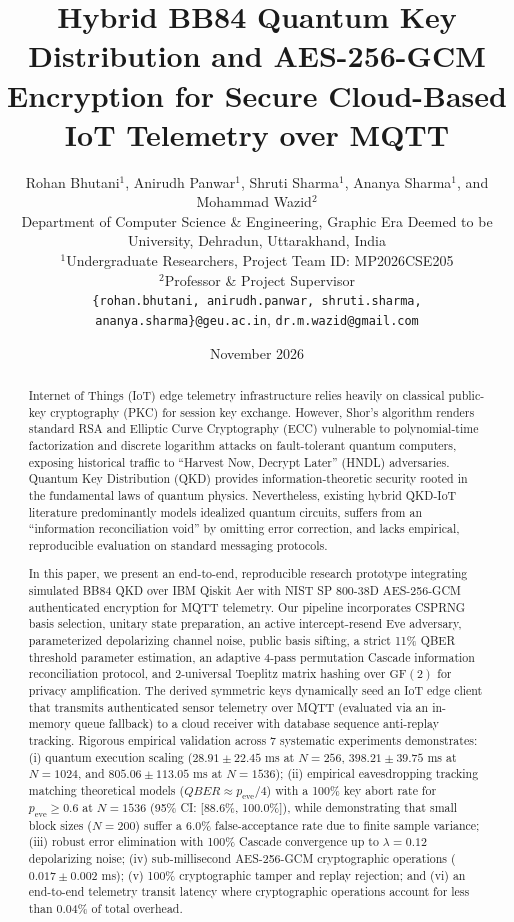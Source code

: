 \documentclass[journal,10pt,twocolumn]{article}
\title{\textbf{Hybrid BB84 Quantum Key Distribution and AES-256-GCM Encryption for Secure Cloud-Based IoT Telemetry over MQTT}}
\author{
    Rohan Bhutani$^1$, Anirudh Panwar$^1$, Shruti Sharma$^1$, Ananya Sharma$^1$, and Mohammad Wazid$^2$ \\
    \small Department of Computer Science \& Engineering, Graphic Era Deemed to be University, Dehradun, Uttarakhand, India \\
    \small $^1$Undergraduate Researchers, Project Team ID: MP2026CSE205 \\
    \small $^2$Professor \& Project Supervisor \\
    \small \texttt{\{rohan.bhutani, anirudh.panwar, shruti.sharma, ananya.sharma\}@geu.ac.in}, \texttt{dr.m.wazid@gmail.com}
}
\date{November 2026}
\begin{document}
\maketitle

\begin{abstract}
Internet of Things (IoT) edge telemetry infrastructure relies heavily on classical public-key cryptography (PKC) for session key exchange. However, Shor's algorithm renders standard RSA and Elliptic Curve Cryptography (ECC) vulnerable to polynomial-time factorization and discrete logarithm attacks on fault-tolerant quantum computers, exposing historical traffic to ``Harvest Now, Decrypt Later'' (HNDL) adversaries. Quantum Key Distribution (QKD) provides information-theoretic security rooted in the fundamental laws of quantum physics. Nevertheless, existing hybrid QKD-IoT literature predominantly models idealized quantum circuits, suffers from an ``information reconciliation void'' by omitting error correction, and lacks empirical, reproducible evaluation on standard messaging protocols. 

In this paper, we present an end-to-end, reproducible research prototype integrating simulated BB84 QKD over IBM Qiskit Aer with NIST SP 800-38D AES-256-GCM authenticated encryption for MQTT telemetry. Our pipeline incorporates CSPRNG basis selection, unitary state preparation, an active intercept-resend Eve adversary, parameterized depolarizing channel noise, public basis sifting, a strict 11\% QBER threshold parameter estimation, an adaptive 4-pass permutation Cascade information reconciliation protocol, and 2-universal Toeplitz matrix hashing over $\text{GF}(2)$ for privacy amplification. The derived symmetric keys dynamically seed an IoT edge client that transmits authenticated sensor telemetry over MQTT (evaluated via an in-memory queue fallback) to a cloud receiver with database sequence anti-replay tracking. Rigorous empirical validation across 7 systematic experiments demonstrates: (i) quantum execution scaling ($28.91 \pm 22.45$ ms at $N=256$, $398.21 \pm 39.75$ ms at $N=1024$, and $805.06 \pm 113.05$ ms at $N=1536$); (ii) empirical eavesdropping tracking matching theoretical models ($QBER \approx p_{\text{eve}}/4$) with a 100\% key abort rate for $p_{\text{eve}} \ge 0.6$ at $N=1536$ (95\% CI: [88.6\%, 100.0\%]), while demonstrating that small block sizes ($N=200$) suffer a 6.0\% false-acceptance rate due to finite sample variance; (iii) robust error elimination with 100\% Cascade convergence up to $\lambda = 0.12$ depolarizing noise; (iv) sub-millisecond AES-256-GCM cryptographic operations ($0.017 \pm 0.002$ ms); (v) 100\% cryptographic tamper and replay rejection; and (vi) an end-to-end telemetry transit latency where cryptographic operations account for less than 0.04\% of total overhead.
\end{abstract}
\end{document}
